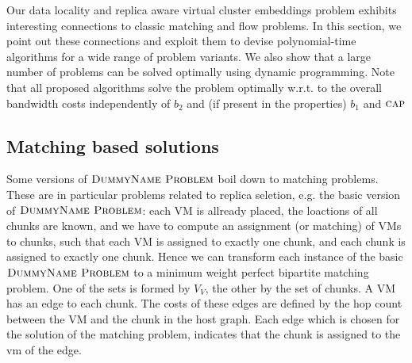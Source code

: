 \documentclass[9pt,twocolumn]{scrartcl}
\newcommand{\Capacity}{\ensuremath{\textsc{cap}}}
\newcommand{\Problem}{\textsc{DummyName Problem}}
\newcommand{\VirtualNodes}{\ensuremath{V_V}}
\newcommand{\CostCom}{\ensuremath{b_1}}
\newcommand{\CostTrans}{\ensuremath{b_2}}
\begin{document}
Our data locality and replica aware virtual cluster embeddings
problem exhibits interesting connections to classic matching and
flow problems. In this section, we point out these connections and
exploit them to devise polynomial-time algorithms for a wide range
of problem variants. We also show that a large number of problems
can be solved optimally using dynamic programming. Note that all proposed
algorithms solve the problem optimally w.r.t. to the overall bandwidth costs
independently of $\CostTrans$ and (if present in the properties) $\CostCom$ and
$\Capacity$

\subsection{Matching based solutions}

Some versions of $\Problem$ boil down to matching problems. These are in
particular problems related to replica seletion, e.g. the basic version of
$\Problem$: each VM
is allready placed, the loactions of all chunks are known, and we have to
compute an assignment (or matching) of VMs to chunks, such that each VM is
assigned to
exactly one chunk, and each chunk is assigned to exactly one chunk. Hence we
can transform each instance of the basic $\Problem$ to a minimum weight
perfect bipartite
matching problem\cite{schrijver_combinatorial_optimization}. One of the sets
is formed by $\VirtualNodes$, the other by the
set of chunks. A VM has an edge to each chunk. The costs of these edges are
defined by the hop count between the VM and the chunk in the host graph. Each
edge which is chosen for the solution of the matching problem, indicates that
the chunk is assigned to the vm of the edge.
\end{document}
